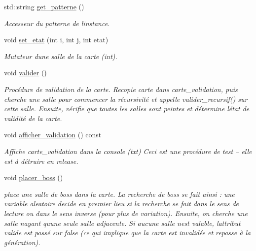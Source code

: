 \begin{DoxyCompactItemize}
std\+::string \hyperlink{classZoneGen_ab1d84dcb2654e8339cd325cf15fcf9ca}{get\+\_\+patterne} ()
\begin{DoxyCompactList}\small\item\em Accesseur du {\itshape patterne} de l\textquotesingle{}instance. \end{DoxyCompactList}\item 
void \hyperlink{classZoneGen_a6b87a471d137c8db268ffc2df0425c81}{set\+\_\+etat} (int i, int j, int etat)
\begin{DoxyCompactList}\small\item\em Mutateur d\textquotesingle{}une \textquotesingle{}salle\textquotesingle{} de la {\itshape carte} (int). \end{DoxyCompactList}\item 
void \hyperlink{classZoneGen_ad0f167f538f4e9f3e12908421297250f}{valider} ()
\begin{DoxyCompactList}\small\item\em Procédure de validation de la {\itshape carte}. Recopie {\itshape carte} dans {\itshape carte\+\_\+validation}, puis cherche une salle pour commencer la récursivité et appelle valider\+\_\+recursif() sur cette salle. Ensuite, vérifie que toutes les salles sont peintes et détermine l\textquotesingle{}état de validité de la {\itshape carte}. \end{DoxyCompactList}\item 
void \hyperlink{classZoneGen_a57bde599d7912da9ee574d5f94c3ea48}{afficher\+\_\+validation} () const 
\begin{DoxyCompactList}\small\item\em Affiche {\itshape carte\+\_\+validation} dans la console (txt) Ceci est une procédure de test -- elle est à détruire en release. \end{DoxyCompactList}\item 
void \hyperlink{classZoneGen_a2e14ba96367ade514d250c4ae1aa5025}{placer\+\_\+boss} ()
\begin{DoxyCompactList}\small\item\em place une salle de boss dans la {\itshape carte}. La recherche de boss se fait ainsi \+: une variable aleatoire decide en premier lieu si la recherche se fait dans le sens de lecture ou dans le sens inverse (pour plus de variation). Ensuite, on cherche une salle n\textquotesingle{}ayant qu\textquotesingle{}une seule salle adjacente. Si aucune salle n\textquotesingle{}est valable, l\textquotesingle{}attribut {\itshape valide} est passé sur false (ce qui implique que la carte est invalidée et repasse à la génération). \end{DoxyCompactList}\item 

\end{DoxyCompactItemize}
